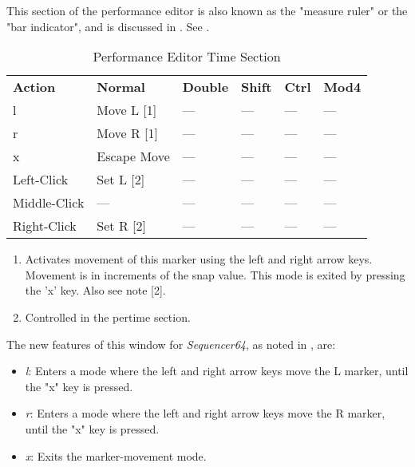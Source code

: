    This section of the performance editor is also known as the "measure ruler"
   or the "bar indicator", and is discussed in
   .
   See .

   \begin{table}[H]
      \centering
      \caption{Performance Editor Time Section}
      \label{table:performance_editor_time_section}
      \begin{tabular}{l l l l l l}
         \textbf{Action}   & \textbf{Normal} & \textbf{Double}    & \textbf{Shift} & \textbf{Ctrl}   & \textbf{Mod4}      \\
         l                 & Move L [1]      & ---                & ---            & ---             & ---                \\
         r                 & Move R [1]      & ---                & ---            & ---             & ---                \\
         x                 & Escape Move     & ---                & ---            & ---             & ---                \\
         Left-Click        & Set L [2]       & ---                & ---            & ---             & ---                \\
         Middle-Click      & ---             & ---                & ---            & ---             & ---                \\
         Right-Click       & Set R [2]       & ---                & ---            & ---             & ---                \\
      \end{tabular}
   \end{table}

   \begin{enumerate}
      \item Activates movement of this marker using the left and right arrow
         keys.  Movement is in increments of the snap value.  This mode is
         exited by pressing the 'x' key.  Also see note [2].
      \item Controlled in the pertime section.
   \end{enumerate}

   The new features of this window for \textsl{Sequencer64},
   as noted in
   ,
   are:

   \begin{itemize}
      \item \textsl{l}:  Enters a mode where the left and right arrow keys move
         the L marker, until the "x" key is pressed.
      \item \textsl{r}:  Enters a mode where the left and right arrow keys move
         the R marker, until the "x" key is pressed.
      \item \textsl{x}:  Exits the marker-movement  mode.
   \end{itemize}

